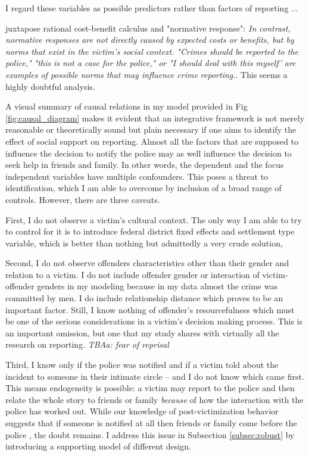 \documentclass[]{article}
\begin{document}
I regard these variables as possible predictors rather than factors of reporting \citep{wikstrom2011does}...

\cite{goudriaan2004reporting} juxtapose rational cost-benefit calculus and "normative response": \textit{ In contrast, normative responses are not directly caused by expected costs or benefits, but by norms that exist in the victim's social context. "Crimes should be reported to the police," "this is not a case for the police," or "I should deal with this myself' are examples of possible norms that may influence crime reporting.}. This seems a highly doubtful analysis.

A visual summary of causal relations in my model provided in Fig \ref{fig:causal_diagram} makes it evident that an integrative framework is not merely reasonable or theoretically sound but plain necessary if one aims to identify the effect of social support on reporting. Almost all the factors that are supposed to influence the decision to notify the police may as well influence the decision to seek help in friends and family. In other words, the dependent and the focus independent variables have multiple confounders. This poses a threat to identification, which I am able to overcome by inclusion of a broad range of controls. However, there are three caveats. 

First, I do not observe a victim's cultural context. The only way I am able to try to control for it is to introduce federal district fixed effects and settlement type variable, which is better than nothing but admittedly a very crude solution,

Second, I do not observe offenders characteristics other than their gender and relation to a victim. I do not include offender gender or interaction of victim-offender genders in my modeling because in my data almost the crime was committed by men. I do include relationship distance which proves to be an important factor. Still, I know nothing of offender's resourcefulness which must be one of the serious considerations in a victim's decision making process. This is an important omission, but one that my study shares with virtually all the research on reporting.
\textit{TBAa: fear of reprisal \citep{felson1999victim}}

Third, I know only if the police was notified and if a victim told about the incident to someone in their intimate circle -- and I do not know which came first. This means endogeneity is possible: a victim may report to the police and then relate the whole story to friends or family \textit{because} of how the interaction with the police has worked out. While our knowledge of post-victimization behavior suggests that if someone is notified at all then friends or family come before the police \citep{ruback2001social, knoth2019reporting}, the doubt remains. I address this issue in Subsection \ref{subsec:robust} by introducing a supporting model of different design. 
\end{document}
